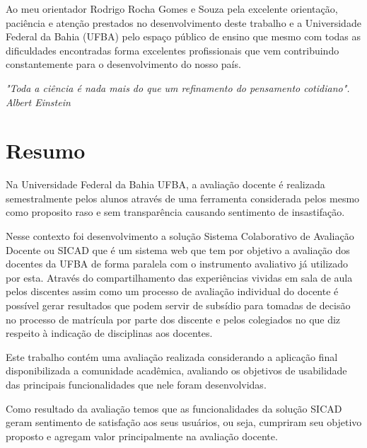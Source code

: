 \documentclass[12pt, a4paper]{report}
\begin{document}
Ao meu orientador Rodrigo Rocha Gomes e Souza pela excelente orientação, paciência e atenção prestados no desenvolvimento deste trabalho e a Universidade Federal da Bahia (UFBA) pelo espaço público de ensino que mesmo com todas as dificuldades encontradas forma excelentes profissionais que vem contribuindo constantemente para o desenvolvimento do nosso país.  
\thispagestyle{empty} 
\newpage
\vspace*{20cm}
\begin{flushright}
\begin{minipage}{8cm}
\begin{flushright}
\textit{
"Toda a ciência é nada mais do que um refinamento do pensamento cotidiano". \\
Albert Einstein}
\end{flushright}
\end{minipage}
\end{flushright}
\thispagestyle{empty} 

\newpage
\chapter*{Resumo}
Na Universidade Federal da Bahia \ac{UFBA}, a avaliação docente é realizada semestralmente pelos alunos através de uma ferramenta considerada pelos mesmo como proposito raso e sem transparência causando sentimento de insastifação. 

Nesse contexto foi desenvolvimento a solução Sistema Colaborativo de Avaliação Docente ou SICAD que é um sistema web que tem por objetivo a avaliação dos docentes da \ac{UFBA} de forma paralela com o instrumento avaliativo já utilizado por esta. Através do compartilhamento das experiências vividas em sala de aula pelos discentes assim como um processo de avaliação individual do docente é possível gerar resultados que podem servir de subsídio para tomadas de decisão no processo de matrícula por parte dos discente e pelos colegiados no que diz respeito à indicação de disciplinas aos docentes.

Este trabalho contém  uma avaliação realizada considerando a  aplicação final disponibilizada a comunidade acadêmica, avaliando os objetivos de usabilidade das principais funcionalidades que nele foram desenvolvidas.

Como resultado da avaliação temos que as funcionalidades da solução \ac{SICAD} geram sentimento de satisfação aos seus usuários, ou seja, cumpriram seu objetivo proposto e agregam valor principalmente na avaliação docente.
\end{document}
